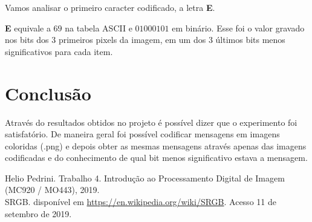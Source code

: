 \documentclass[conference]{IEEEtran}
\begin{document}
    Vamos analisar o primeiro caracter codificado, a letra \textbf{E}.

    \textbf{E} equivale a $69$ na tabela ASCII e $01000101$ em binário.
    Esse foi o valor gravado nos bits dos 3 primeiros pixels da imagem, em um dos 3 últimos bits menos significativos para cada item.


\section{Conclusão}

    Através do resultados obtidos no projeto é possível dizer que o experimento foi satisfatório.
    De maneira geral foi possível codificar mensagens em imagens coloridas (.png) e depois obter as mesmas mensagens através apenas das imagens codificadas e do conhecimento de qual bit menos significativo estava a mensagem.


\begin{thebibliography}{00}

   Helio Pedrini. Trabalho 4. Introdução ao Processamento Digital de Imagem (MC920 / MO443), 2019.\\

   SRGB. disponível em \url{https://en.wikipedia.org/wiki/SRGB}. Acesso 11 de setembro de 2019.

\end{thebibliography}
\end{document}

